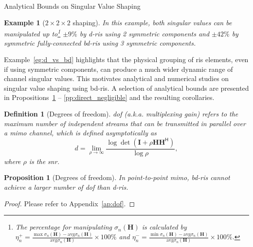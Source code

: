 \documentclass[journal]{IEEEtran}
\newtheorem{definition}{Definition}
\newtheorem{example}{Example}
\newtheorem{proposition}{Proposition}
\begin{document}
\begin{section}{Analytical Bounds on Singular Value Shaping}
\begin{example}[$2 \times 2 \times 2$ shaping]
		In this example, both singular values can be manipulated up to\footnote{The percentage for manipulating $\sigma_n(\mathbf{H})$ is calculated by $\eta_n^+ = \frac{\max \sigma_n(\mathbf{H}) - \mathrm{avg} \sigma_n(\mathbf{H})}{\mathrm{avg} \sigma_n(\mathbf{H})} \times 100\%$ and  $\eta_n^- = \frac{\min \sigma_n(\mathbf{H}) - \mathrm{avg} \sigma_n(\mathbf{H})}{\mathrm{avg} \sigma_n(\mathbf{H})} \times 100\%$.} $\pm 9\%$ by \gls{d}-\gls{ris} using 2 symmetric components and $\pm 42\%$ by symmetric fully-connected \gls{bd}-\gls{ris} using 3 symmetric components.
	\end{example}

	Example~\ref{eg:d_vs_bd} highlights that the physical grouping of \gls{ris} elements, even if using symmetric components, can produce a much wider dynamic range of channel singular values.
	This motivates analytical and numerical studies on singular value shaping using \gls{bd}-\gls{ris}.
	A selection of analytical bounds are presented in Propositions~\ref{pp:dof} -- \ref{pp:direct_negligible} and the resulting corollaries.


		\begin{definition}[Degrees of freedom]
			\gls{dof} (a.k.a. multiplexing gain) refers to the maximum number of independent streams that can be transmitted in parallel over a \gls{mimo} channel, which is defined asymptotically as
			\begin{equation}
				d = \lim_{\rho \to \infty} \frac{\log \det(\mathbf{I} + \rho \mathbf{H} \mathbf{H}^\mathsf{H})}{\log \rho},
			\end{equation}
			where $\rho$ is the \gls{snr}.

		\end{definition}

		\begin{proposition}[Degrees of freedom]\label{pp:dof}
			In point-to-point \gls{mimo}, \gls{bd}-\gls{ris} cannot achieve a larger number of \gls{dof} than \gls{d}-\gls{ris}.
		\end{proposition}
		\begin{proof}
			Please refer to Appendix~\ref{ap:dof}.
		\end{proof}


\end{section}
\end{document}
